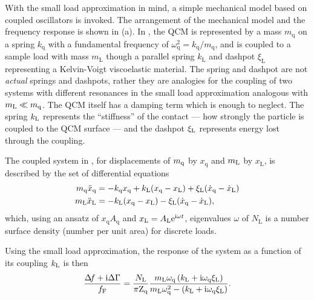 With the small load approximation in mind, a simple mechanical model based
on coupled oscillators is invoked.  The arrangement of the mechanical model
and the frequency response is shown in (a).  In
, the QCM is represented by a mass
$m_\mathrm{q}$ on a spring $k_\mathrm{q}$ with a fundamental frequency of
$\omega_\mathrm{q}^2=k_\mathrm{q}/m_\mathrm{q}$, and is coupled to a sample
load with mass $m_\mathrm{L}$ though a parallel spring $k_\mathrm{L}$ and
dashpot $\xi_\mathrm{L}$ representing a Kelvin-Voigt viscoelastic material.
The spring and dashpot are not \textit{actual} springs and dashpots, rather
they are analogies for the coupling of two systems with different
resonances in the small load approximation analogous with $m_\mathrm{L}\ll m_\mathrm{q}$.  The
QCM itself has a damping term which is enough to neglect.  The spring $k_\mathrm{L}$
represents the ``stiffness'' of the contact --- how strongly the particle is
coupled to the QCM surface --- and the dashpot $\xi_\mathrm{L}$ represents energy lost
through the coupling.

The coupled system in , for displacements of
$m_\mathrm{q}$ by $x_\mathrm{q}$ and $m_\mathrm{L}$ by $x_\mathrm{L}$, is described by the
set of differential equations
\begin{align}
 m_\mathrm{q} \ddot{x}_\mathrm{q} &= -k_\mathrm{q} x_\mathrm{q} +k_\mathrm{L} (x_\mathrm{q}-x_\mathrm{L}) + \xi_\mathrm{L} (\dot{x}_\mathrm{q}-\dot{x}_\mathrm{L})\\
 m_\mathrm{L} \ddot{x}_\mathrm{L} &= -k_\mathrm{L} (x_\mathrm{q}-x_\mathrm{L}) - \xi_\mathrm{L} (\dot{x}_\mathrm{q}-\dot{x}_\mathrm{L}),
\end{align}
which, using an ansatz of
$x_\mathrm{q}A_\mathrm{q}$ and $x_\mathrm{L}=A_\mathrm{L}{\mathrm{e}}^{{\mathrm{i}} \omega
t}$,
eigenvalues $\omega$ of
$N_\mathrm{L}$ is a number surface density (number per unit area) for discrete
loads.

Using the small load approximation, the response of the system
as a function of its coupling $k_\mathrm{L}$ is then
\begin{equation}
\frac{\Delta\!f + {\mathrm{i}} \Delta \Gamma}{f_\mathrm{F}} = \frac{N_\mathrm{L}}{\pi
\mathrm{Z}_\mathrm{q}}
\frac{m_\mathrm{L} \omega_\mathrm{q} \left( k_\mathrm{L} + {\mathrm{i}}
\omega_\mathrm{q} \xi_\mathrm{L}\right) }
{m_\mathrm{L} \omega_\mathrm{q}^2 - \left(k_\mathrm{L} + {\mathrm{i}}
\omega_\mathrm{q} \xi_\mathrm{L}\right)}.
\label{eqn:mastereq}
\end{equation}

